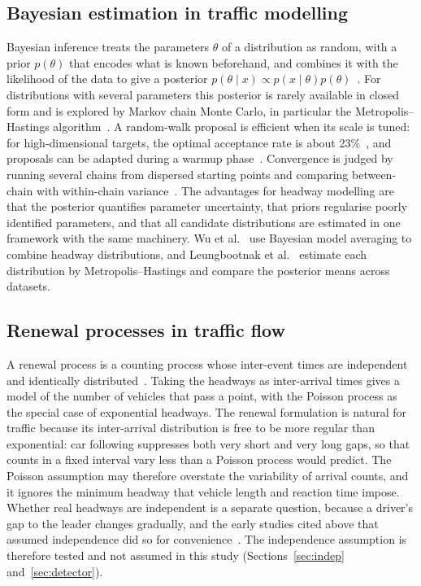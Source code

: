 \documentclass[11pt,a4paper]{article}
\numberwithin{equation}{section}
\begin{document}
\subsection{Bayesian estimation in traffic modelling}
Bayesian inference treats the parameters $\theta$ of a distribution as random, with a prior $p(\theta)$ that encodes what is known beforehand, and combines it with the likelihood of the data to give a posterior
$p(\theta\mid x)\propto p(x\mid\theta)p(\theta)$~\cite{gelman2013}. For distributions with several parameters this posterior is rarely available in closed form and is explored by Markov chain Monte Carlo, in particular the Metropolis--Hastings
algorithm~\cite{metropolis1953,hastings1970}. A random-walk proposal is efficient when its scale is tuned: for high-dimensional targets, the optimal acceptance rate is about 23\%~\cite{roberts1997}, and proposals can be adapted
during a warmup phase~\cite{haario2001}. Convergence is judged by running several chains from dispersed starting points and comparing between-chain with within-chain variance~\cite{gelman1992,vehtari2021}.
The advantages for headway modelling are that the posterior quantifies parameter uncertainty, that priors regularise poorly identified parameters, and that all candidate distributions are estimated in one framework with the same machinery. Wu et al.~\cite{wu2023} use Bayesian model averaging
to combine headway distributions, and Leungbootnak et al.~\cite{leungbootnak} estimate each distribution by Metropolis--Hastings and compare the posterior means across datasets.

\subsection{Renewal processes in traffic flow}
A renewal process is a counting process whose inter-event times are independent and identically distributed~\cite{cox1962,ross1996}. Taking the headways as inter-arrival times gives a model of the number of vehicles that pass a point, with the Poisson
process as the special case of exponential headways. The renewal formulation is natural for traffic because its inter-arrival distribution is free to be more regular than exponential: car following suppresses both very short
and very long gaps, so that counts in a fixed interval vary less than a Poisson process would predict. The Poisson assumption may therefore overstate the variability of arrival counts, and it ignores the minimum headway that vehicle length and reaction time impose.
Whether real headways are independent is a separate question, because a driver's gap to the leader changes gradually, and the early studies cited above that assumed independence did so for convenience~\cite{leungbootnak}.
The independence assumption is therefore tested and not assumed in this study (Sections~\ref{sec:indep} and~\ref{sec:detector}).
\end{document}
